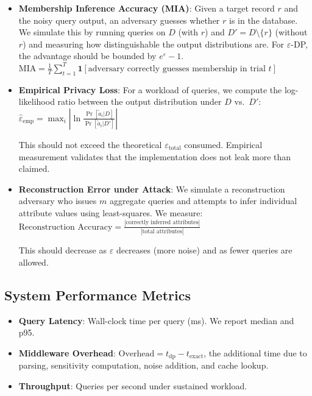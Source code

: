 \documentclass[sigconf,nonacm]{acmart}
\begin{document}
\begin{itemize}
    \item \textbf{Membership Inference Accuracy (MIA)}: Given a target record $r$ and the noisy query output, an adversary guesses whether $r$ is in the database. We simulate this by running queries on $D$ (with $r$) and $D' = D \setminus \{r\}$ (without $r$) and measuring how distinguishable the output distributions are. For $\varepsilon$-DP, the advantage should be bounded by $e^{\varepsilon} - 1$.
    $\text{MIA} = \frac{1}{T}\sum_{t=1}^{T} \mathbf{1}[\text{adversary correctly guesses membership in trial } t]$

    \item \textbf{Empirical Privacy Loss}: For a workload of queries, we compute the log-likelihood ratio between the output distribution under $D$ vs.\ $D'$:
    $\hat{\varepsilon}_{\text{emp}} = \max_{i} \left| \ln \frac{\Pr[\tilde{a}_i | D]}{\Pr[\tilde{a}_i | D']} \right|$

    This should not exceed the theoretical $\varepsilon_{\text{total}}$ consumed. Empirical measurement validates that the implementation does not leak more than claimed.

    \item \textbf{Reconstruction Error under Attack}: We simulate a reconstruction adversary who issues $m$ aggregate queries and attempts to infer individual attribute values using least-squares. We measure:
    $\text{Reconstruction Accuracy} = \frac{|\text{correctly inferred attributes}|}{|\text{total attributes}|}$

    This should decrease as $\varepsilon$ decreases (more noise) and as fewer queries are allowed.
\end{itemize}

\subsection{System Performance Metrics}

\begin{itemize}
    \item \textbf{Query Latency}: Wall-clock time per query (ms). We report median and p95.
    \item \textbf{Middleware Overhead}: $\text{Overhead} = t_{\text{dp}} - t_{\text{exact}}$, the additional time due to parsing, sensitivity computation, noise addition, and cache lookup.
    \item \textbf{Throughput}: Queries per second under sustained workload.
\end{itemize}
\end{document}
